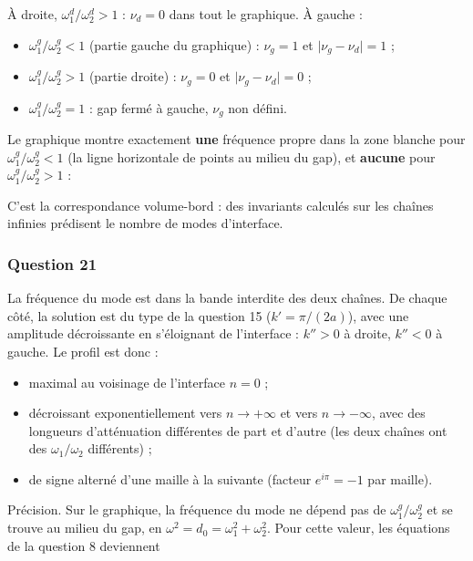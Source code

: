 \documentclass[11pt,a4paper]{article}
\providecommand{\tightlist}{\setlength{\itemsep}{0pt}\setlength{\parskip}{0pt}}
\newcommand{\equationajustee}[1]{%
  \sbox{\boiteequation}{$\displaystyle #1$}%
  \ifdim\wd\boiteequation>\linewidth
    \[\resizebox{\linewidth}{!}{\usebox{\boiteequation}}\]%
  \else
    \[#1\]%
  \fi}
\begin{document}
À droite, \(\omega_1^d/\omega_2^d>1\) : \(\boxed{\nu_d=0}\) dans tout le graphique. À gauche :

\begin{itemize}
\tightlist
\item
  \(\omega_1^g/\omega_2^g<1\) (partie gauche du graphique) : \(\nu_g=1\) et \(\lvert\nu_g-\nu_d\rvert=1\) ;
\item
  \(\omega_1^g/\omega_2^g>1\) (partie droite) : \(\nu_g=0\) et \(\lvert\nu_g-\nu_d\rvert=0\) ;
\item
  \(\omega_1^g/\omega_2^g=1\) : gap fermé à gauche, \(\nu_g\) non défini.
\end{itemize}

Le graphique montre exactement \textbf{une} fréquence propre dans la zone blanche pour \(\omega_1^g/\omega_2^g<1\) (la ligne horizontale de points au milieu du gap), et \textbf{aucune} pour \(\omega_1^g/\omega_2^g>1\) :

\equationajustee{\boxed{N_{\text{gap}}=|\nu_g-\nu_d|}}

C'est la correspondance volume-bord : des invariants calculés sur les chaînes infinies prédisent le nombre de modes d'interface.

\hypertarget{question-21}{%
\subsubsection{Question 21}\label{question-21}}

La fréquence du mode est dans la bande interdite des deux chaînes. De chaque côté, la solution est du type de la question 15 (\(k'=\pi/(2a)\)), avec une amplitude décroissante en s'éloignant de l'interface : \(k''>0\) à droite, \(k''<0\) à gauche. Le profil est donc :

\begin{itemize}
\tightlist
\item
  maximal au voisinage de l'interface \(n=0\) ;
\item
  décroissant exponentiellement vers \(n\to+\infty\) et vers \(n\to-\infty\), avec des longueurs d'atténuation différentes de part et d'autre (les deux chaînes ont des \(\omega_1/\omega_2\) différents) ;
\item
  de signe alterné d'une maille à la suivante (facteur \(e^{i\pi}=-1\) par maille).
\end{itemize}

Précision. Sur le graphique, la fréquence du mode ne dépend pas de \(\omega_1^g/\omega_2^g\) et se trouve au milieu du gap, en \(\omega^2=d_0=\omega_1^2+\omega_2^2\). Pour cette valeur, les équations de la question 8 deviennent
\end{document}
